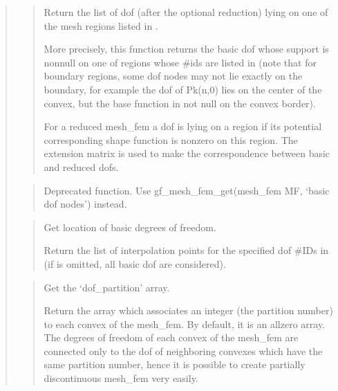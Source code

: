 \documentclass[a4paper,11pt,english]{sphinxmanual}
\begin{document}
\begin{quote}
\begin{quote}
\sphinxAtStartPar
Return the list of dof (after the optional reduction) lying on one
of the mesh regions listed in .

\sphinxAtStartPar
More precisely, this function returns the basic dof whose support is
non\sphinxhyphen{}null on one of regions whose \#ids are listed in  (note
that for boundary regions, some dof nodes may not lie exactly
on the boundary, for example the dof of Pk(n,0) lies on the center
of the convex, but the base function in not null on the convex
border).

\sphinxAtStartPar
For a reduced mesh\_fem
a dof is lying on a region if its potential corresponding shape
function is nonzero on this region. The extension matrix is used
to make the correspondence between basic and reduced dofs.
\end{quote}

\sphinxAtStartPar
{}
\begin{quote}

\sphinxAtStartPar
Deprecated function. Use gf\_mesh\_fem\_get(mesh\_fem MF, ‘basic dof nodes’) instead.
\end{quote}

\sphinxAtStartPar
{}
\begin{quote}

\sphinxAtStartPar
Get location of basic degrees of freedom.

\sphinxAtStartPar
Return the list of interpolation points for the specified
dof \#IDs in  (if  is omitted, all basic dof are
considered).
\end{quote}

\sphinxAtStartPar
{}
\begin{quote}

\sphinxAtStartPar
Get the ‘dof\_partition’ array.

\sphinxAtStartPar
Return the array which associates an integer (the partition number)
to each convex of the mesh\_fem. By default, it is an all\sphinxhyphen{}zero array.
The degrees of freedom of each convex of the mesh\_fem are connected
only to the dof of neighboring convexes which have the same
partition number, hence it is possible to create partially
discontinuous mesh\_fem very easily.
\end{quote}


\end{quote}
\end{document}
